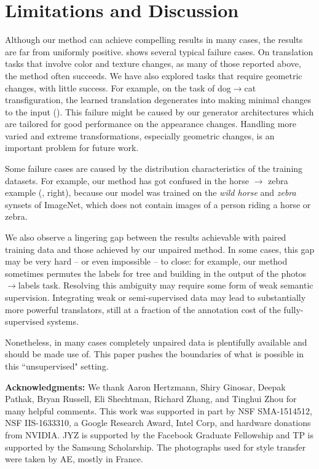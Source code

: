 \section{Limitations and Discussion}
Although our method can achieve compelling results in many cases, the results are far from uniformly positive.  shows several typical failure cases. On translation tasks that involve color and texture changes, as many of those reported above, the method often succeeds. We have also explored tasks that require geometric changes, with little success. For example, on the task of dog$\rightarrow$cat transfiguration, the learned translation degenerates into making minimal changes to the input (). This failure might be caused by our generator architectures which are tailored for good performance on the appearance changes. Handling more varied and extreme transformations, especially geometric changes, is an important problem for future work.

Some failure cases are caused by the distribution characteristics of the training datasets. For example, our method  has got confused in the horse $\rightarrow$ zebra example (, right), because our model was trained on the {\it wild horse} and {\it zebra} synsets of ImageNet, which does not contain images of a person riding a horse or zebra.

We also observe a lingering gap between the results achievable with paired training data and those achieved by our unpaired method. In some cases, this gap may be very hard -- or even impossible -- to close: for example, our method sometimes permutes the labels for tree and building in the output of the photos$\rightarrow$labels task. Resolving this ambiguity may require some form of weak semantic supervision. Integrating weak or semi-supervised data may lead to substantially more powerful translators, still at a fraction of the annotation cost of the fully-supervised systems.

Nonetheless, in many cases completely unpaired data is plentifully available and should be made use of. This paper pushes the boundaries of what is possible in this ``unsupervised" setting.

{\bf Acknowledgments:} We thank Aaron Hertzmann, Shiry Ginosar, Deepak Pathak, Bryan Russell, Eli Shechtman, Richard Zhang, and Tinghui Zhou for many helpful comments. This work was supported in part by NSF SMA-1514512, NSF IIS-1633310, a Google Research Award, Intel Corp, and hardware donations from NVIDIA. JYZ is supported by the Facebook Graduate Fellowship and TP is supported by the Samsung Scholarship. The photographs used for style transfer were taken by AE, mostly in France.




